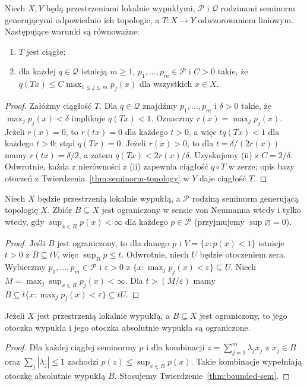 \begin{twierdzenie}
\label{thm:continuous-sem}
Niech $X,Y$ będą przestrzeniami lokalnie wypukłymi,
$\mathcal P$ i $\mathcal Q$ rodzinami seminorm generującymi
odpowiednio ich topologie, a $T:X\to Y$ odwzorowaniem liniowym.
Następujące warunki są równoważne:
\begin{enumerate}[label=\textup{(\roman*)}]
\item $T$ jest ciągłe;
\item dla każdej $q\in\mathcal Q$ istnieją $m\ge1$,
$p_1,\ldots,p_m\in\mathcal P$ i $C>0$ takie, że
$q(Tx)\le C\max_{1\le j\le m}p_j(x)$ dla wszystkich $x\in X$.
\end{enumerate}
\end{twierdzenie}
\begin{proof}
Załóżmy ciągłość $T$. Dla $q\in\mathcal Q$
znajdźmy $p_1,\ldots,p_m$ i $\delta>0$ takie, że
$\max_jp_j(x)<\delta$ implikuje $q(Tx)<1$.
Oznaczmy $r(x)=\max_jp_j(x)$. Jeżeli $r(x)=0$,
to $r(tx)=0$ dla każdego $t>0$, a więc
$tq(Tx)<1$ dla każdego $t>0$; stąd $q(Tx)=0$.
Jeżeli $r(x)>0$, to dla
$t=\delta/(2r(x))$ mamy $r(tx)=\delta/2$,
a zatem $q(Tx)<2r(x)/\delta$. Uzyskujemy (ii)
z $C=2/\delta$. Odwrotnie, każda z nierówności
z (ii) zapewnia ciągłość $q\circ T$ w zerze;
opis bazy otoczeń z Twierdzenia~\ref{thm:seminorm-topology}
w $Y$ daje ciągłość $T$.
\end{proof}

\begin{twierdzenie}
\label{thm:bounded-sem}
Niech $X$ będzie przestrzenią lokalnie wypukłą,
a $\mathcal P$ rodziną seminorm generującą topologię $X$.
Zbiór $B\subseteq X$ jest ograniczony w sensie von Neumanna
wtedy i tylko wtedy, gdy
$\sup_{x\in B}p(x)<\infty$ dla każdego $p\in\mathcal P$
(przyjmujemy $\sup\varnothing=0$).
\end{twierdzenie}
\begin{proof}
Jeśli $B$ jest ograniczony, to dla danego $p$ i
$V=\{x:p(x)<1\}$ istnieje $t>0$ z $B\subseteq tV$,
więc $\sup_Bp\le t$.
Odwrotnie, niech $U$ będzie otoczeniem zera.
Wybierzmy $p_1,\ldots,p_m\in\mathcal P$ i
$\varepsilon>0$ z
$\{x:\max_jp_j(x)<\varepsilon\}\subseteq U$.
Niech $M=\max_j\sup_{x\in B}p_j(x)<\infty$.
Dla $t>(M/\varepsilon)$ mamy
$B\subseteq t\{x:\max_jp_j(x)<\varepsilon\}\subseteq tU$.
\end{proof}

\begin{wniosek}
\label{cor:absconv-bounded}
Jeżeli $X$ jest przestrzenią lokalnie wypukłą,
a $B\subseteq X$ jest ograniczony, to jego otoczka wypukła
i jego otoczka absolutnie wypukła są ograniczone.
\end{wniosek}
\begin{proof}
Dla każdej ciągłej seminormy $p$ i dla kombinacji
$z=\sum_{j=1}^m\lambda_jx_j$ z $x_j\in B$ oraz
$\sum_j|\lambda_j|\le1$ zachodzi
$p(z)\le\sup_{x\in B}p(x)$. Takie kombinacje
wypełniają otoczkę absolutnie wypukłą $B$.
Stosujemy Twierdzenie~\ref{thm:bounded-sem}.
\end{proof}

